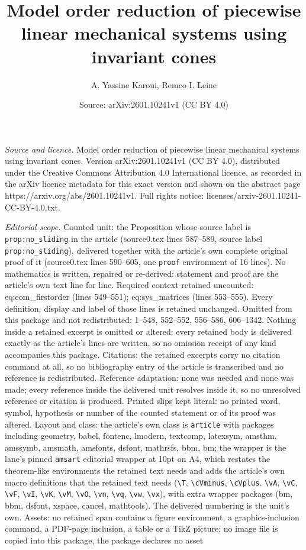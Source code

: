 \documentclass[10pt,a4paper]{amsart}
\title[Model order reduction of piecewise linear mechanical systems]{Model order reduction of piecewise linear mechanical systems using invariant cones}
\author{A. Yassine Karoui, Remco I. Leine}
\date{Source: arXiv:2601.10241v1 (CC BY 4.0)}
\begin{document}
\maketitle

\noindent\emph{Source and licence.} Model order reduction of piecewise linear mechanical systems using invariant cones. Version arXiv:2601.10241v1 (CC BY 4.0), distributed under the Creative Commons Attribution 4.0 International licence, as recorded in the arXiv licence metadata for this exact version and shown on the abstract page https://arxiv.org/abs/2601.10241v1. Full rights notice: licenses/arxiv-2601.10241-CC-BY-4.0.txt.\par\smallskip

\noindent\textit{Editorial scope.} Counted unit: the Proposition whose source label is \texttt{prop:no\_sliding} in the article (source0.tex lines 587--589, source label \texttt{prop:no\_sliding}), delivered together with the article's own complete original proof of it (source0.tex lines 590--605, one \texttt{proof} environment of 16 lines). No mathematics is written, repaired or re-derived: statement and proof are the article's own text line for line. Required context retained uncounted: eq:eom\_firstorder (lines 549--551); eq:sys\_matrices (lines 553--555). Every definition, display and label of those lines is retained unchanged. Omitted from this package and not redistributed: 1--548, 552--552, 556--586, 606--1342. Nothing inside a retained excerpt is omitted or altered: every retained body is delivered exactly as the article's lines are written, so no omission receipt of any kind accompanies this package. Citations: the retained excerpts carry no citation command at all, so no bibliography entry of the article is transcribed and no reference is redistributed. Reference adaptation: none was needed and none was made; every reference inside the delivered unit resolves inside it, so no unresolved reference or citation is produced. Printed slips kept literal: no printed word, symbol, hypothesis or number of the counted statement or of its proof was altered. Layout and class: the article's own class is \texttt{article} with packages including geometry, babel, fontenc, lmodern, textcomp, latexsym, amsthm, amssymb, amsmath, amsfonts, dsfont, mathrsfs, bbm, bm; the wrapper is the lane's pinned \texttt{amsart} editorial wrapper at 10pt on A4, which restates the theorem-like environments the retained text needs and adds the article's own macro definitions that the retained text needs (\texttt{\textbackslash T}, \texttt{\textbackslash cVminus}, \texttt{\textbackslash cVplus}, \texttt{\textbackslash vA}, \texttt{\textbackslash vC}, \texttt{\textbackslash vF}, \texttt{\textbackslash vI}, \texttt{\textbackslash vK}, \texttt{\textbackslash vM}, \texttt{\textbackslash vO}, \texttt{\textbackslash vn}, \texttt{\textbackslash vq}, \texttt{\textbackslash vw}, \texttt{\textbackslash vx}), with extra wrapper packages (bm, bbm, dsfont, xspace, cancel, mathtools). The delivered numbering is the unit's own. Assets: no retained span contains a figure environment, a graphics-inclusion command, a PDF-page inclusion, a table or a TikZ picture; no image file is copied into this package, the package declares no asset 
\end{document}
